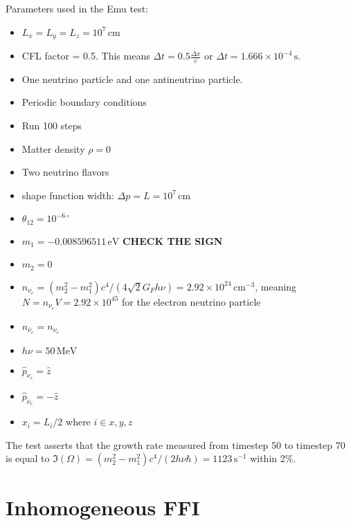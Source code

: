 \documentclass{article}
\begin{document}
Parameters used in the Emu test:
\begin{itemize}
\item $L_x=L_y=L_z=10^7\,\mathrm{cm}$
\item CFL factor = 0.5. This means $\Delta t = 0.5 \frac{\Delta x}{c}$ or $\Delta t = 1.666 \times10^{-4}\,\mathrm{s}$.
\item One neutrino particle and one antineutrino particle.
\item Periodic boundary conditions
\item Run 100 steps
\item Matter density $\rho=0$
\item Two neutrino flavors
\item shape function width: $\Delta p=L=10^7\,\mathrm{cm}$
\item $\theta_{12}=10^{-6 \circ}$
\item $m_1 = -0.008596511\,\mathrm{eV}$ \textbf{CHECK THE SIGN}
\item $m_2 = 0$
\item $n_{\nu_e}=(m_2^2-m_1^2) c^4/ (4 \sqrt{2} G_F h\nu)=2.92 \times10^{24}\,\mathrm{cm}^{-3}$, meaning $N=n_{\nu_e}V=2.92\times10^{45}$ for the electron neutrino particle
\item $n_{\bar{\nu}_e} = n_{\nu_e}$
\item $h\nu=50\,\mathrm{MeV}$
\item $\hat{p}_{\nu_e} = \hat{z}$
\item $\hat{p}_{\bar{\nu}_e} = -\hat{z}$
\item $x_i = L_i/2$ where $i\in{x,y,z}$
\end{itemize}

The test asserts that the growth rate measured from timestep 50 to timestep 70 is equal to $\Im(\Omega)=(m_2^2-m_1^2)c^4/(2 h\nu \hbar)=1123\,\mathrm{s}^{-1}$ within 2\%.

\section{Inhomogeneous FFI}
\end{document}
